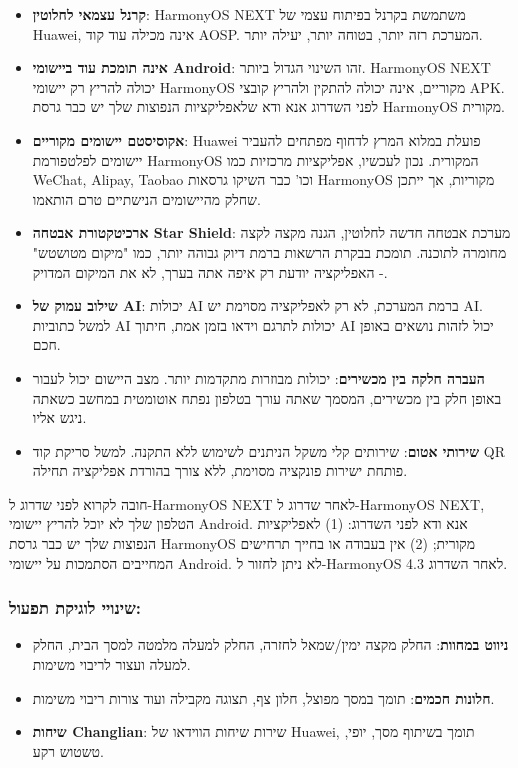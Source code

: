 \begin{itemize}
  \item \textbf{קרנל עצמאי לחלוטין}: HarmonyOS NEXT משתמשת בקרנל בפיתוח עצמי של Huawei, אינה מכילה עוד קוד AOSP. המערכת רזה יותר, בטוחה יותר, יעילה יותר.
  \item \textbf{אינה תומכת עוד ביישומי Android}: זהו השינוי הגדול ביותר. HarmonyOS NEXT יכולה להריץ רק יישומי HarmonyOS מקוריים, אינה יכולה להתקין ולהריץ קובצי APK. לפני השדרוג אנא ודא שלאפליקציות הנפוצות שלך יש כבר גרסת HarmonyOS מקורית.
  \item \textbf{אקוסיסטם יישומים מקוריים}: Huawei פועלת במלוא המרץ לדחוף מפתחים להעביר יישומים לפלטפורמת HarmonyOS המקורית. נכון לעכשיו, אפליקציות מרכזיות כמו WeChat, Alipay, Taobao וכו' כבר השיקו גרסאות HarmonyOS מקוריות, אך ייתכן שחלק מהיישומים הנישתיים טרם הותאמו.
  \item \textbf{ארכיטקטורת אבטחה Star Shield}: מערכת אבטחה חדשה לחלוטין, הגנה מקצה לקצה מחומרה לתוכנה. תומכת בבקרת הרשאות ברמת דיוק גבוהה יותר, כמו "מיקום מטושטש" - האפליקציה יודעת רק איפה אתה בערך, לא את המיקום המדויק.
  \item \textbf{שילוב עמוק של AI}: יכולות AI ברמת המערכת, לא רק לאפליקציה מסוימת יש AI. למשל כתוביות AI יכולות לתרגם וידאו בזמן אמת, חיתוך AI יכול לזהות נושאים באופן חכם.
  \item \textbf{העברה חלקה בין מכשירים}: יכולות מבוזרות מתקדמות יותר. מצב היישום יכול לעבור באופן חלק בין מכשירים, המסמך שאתה עורך בטלפון נפתח אוטומטית במחשב כשאתה ניגש אליו.
  \item \textbf{שירותי אטום}: שירותים קלי משקל הניתנים לשימוש ללא התקנה. למשל סריקת קוד QR פותחת ישירות פונקציה מסוימת, ללא צורך בהורדת אפליקציה תחילה.
\end{itemize}

\begin{tcbwarn}{חובה לקרוא לפני שדרוג ל-HarmonyOS NEXT}
לאחר שדרוג ל-HarmonyOS NEXT, הטלפון שלך לא יוכל להריץ יישומי Android. אנא ודא לפני השדרוג: (1) לאפליקציות הנפוצות שלך יש כבר גרסת HarmonyOS מקורית; (2) אין בעבודה או בחייך תרחישים המחייבים הסתמכות על יישומי Android. לא ניתן לחזור ל-HarmonyOS 4.3 לאחר השדרוג.

\end{tcbwarn}

\subsubsection*{שינויי לוגיקת תפעול:}

\begin{itemize}
  \item \textbf{ניווט במחוות}: החלק מקצה ימין/שמאל לחזרה, החלק למעלה מלמטה למסך הבית, החלק למעלה ועצור לריבוי משימות.
  \item \textbf{חלונות חכמים}: תומך במסך מפוצל, חלון צף, תצוגה מקבילה ועוד צורות ריבוי משימות.
  \item \textbf{שיחות Changlian}: שירות שיחות הווידאו של Huawei, תומך בשיתוף מסך, יופי, טשטוש רקע.
\end{itemize}

